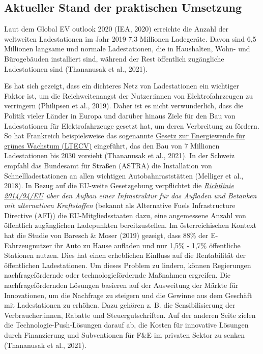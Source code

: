 \documentclass[
]{book}
\begin{document}
\hypertarget{aktueller-stand-der-praktischen-umsetzung-8}{%
\subsection*{Aktueller Stand der praktischen Umsetzung}\label{aktueller-stand-der-praktischen-umsetzung-8}}

Laut dem Global EV outlook 2020 (IEA, 2020) erreichte die Anzahl der weltweiten Ladestationen im Jahr 2019 7,3 Millionen Ladegeräte. Davon sind 6,5 Millionen langsame und normale Ladestationen, die in Haushalten, Wohn- und Bürogebäuden installiert sind, während der Rest öffentlich zugängliche Ladestationen sind (Thananusak et al., 2021).

Es hat sich gezeigt, dass ein dichteres Netz von Ladestationen ein wichtiger Faktor ist, um die Reichweitenangst der Nutzer:innen von Elektrofahrzeugen zu verringern (Philipsen et al., 2019). Daher ist es nicht verwunderlich, dass die Politik vieler Länder in Europa und darüber hinaus Ziele für den Bau von Ladestationen für Elektrofahrzeuge gesetzt hat, um deren Verbreitung zu fördern. So hat Frankreich beispielsweise das sogenannte \href{https://www.iea.org/policies/8737-law-on-energy-transition-for-green-growth-ltecv}{Gesetz zur Energiewende für grünes Wachstum (LTECV)} eingeführt, das den Bau von 7 Millionen Ladestationen bis 2030 vorsieht (Thananusak et al., 2021). In der Schweiz empfahl das Bundesamt für Straßen (ASTRA) die Installation von Schnellladestationen an allen wichtigen Autobahnraststätten (Melliger et al., 2018). In Bezug auf die EU-weite Gesetzgebung verpflichtet die \emph{\href{https://eur-lex.europa.eu/legal-content/EN/TXT/HTML/?uri=CELEX:32014L0094\&from=en}{Richtlinie 2014/94/EU} über den Aufbau einer Infrastruktur für das Aufladen und Betanken mit alternativen Kraftstoffen} (bekannt als Alternative Fuels Infrastructure Directive (AFI)) die EU-Mitgliedsstaaten dazu, eine angemessene Anzahl von öffentlich zugänglichen Ladepunkten bereitzustellen.
Im österreichischen Kontext hat die Studie von Baresch \& Moser (2019) gezeigt, dass 88\% der E-Fahrzeugnutzer ihr Auto zu Hause aufladen und nur 1,5\% - 1,7\% öffentliche Stationen nutzen. Dies hat einen erheblichen Einfluss auf die Rentabilität der öffentlichen Ladestationen. Um dieses Problem zu lindern, können Regierungen nachfragefördernde oder technologiefördernde Maßnahmen ergreifen. Die nachfragefördernden Lösungen basieren auf der Ausweitung der Märkte für Innovationen, um die Nachfrage zu steigern und die Gewinne aus dem Geschäft mit Ladestationen zu erhöhen. Dazu gehören z. B. die Sensibilisierung der Verbraucher:innen, Rabatte und Steuergutschriften. Auf der anderen Seite zielen die Technologie-Push-Lösungen darauf ab, die Kosten für innovative Lösungen durch Finanzierung und Subventionen für F\&E im privaten Sektor zu senken (Thananusak et al., 2021).
\end{document}
